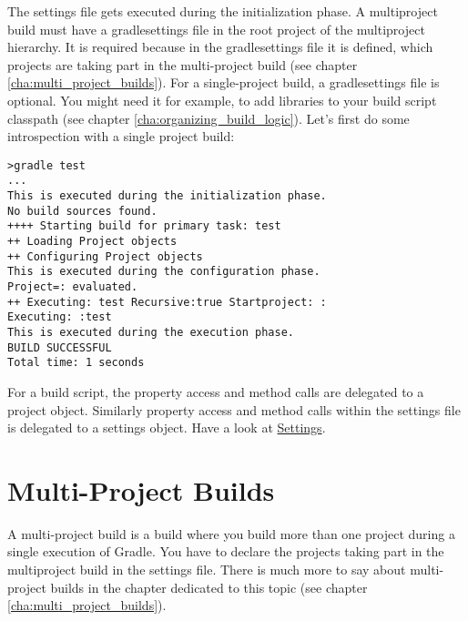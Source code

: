 The settings file gets executed during the initialization phase. A multiproject build must have a gradlesettings file in the root project of the multiproject hierarchy. It is required because in the gradlesettings file it is defined, which projects are taking part in the multi-project build (see chapter \ref{cha:multi_project_builds}). For a single-project build, a gradlesettings file is optional. You might need it for example, to add libraries to your build script classpath (see chapter \ref{cha:organizing_build_logic}). Let's first do some introspection with a single project build:
\begin{Verbatim}[frame=single,label=current dir: userguide/buildlifecycle,framesep=1mm,framerule=1mm]
>gradle test 
...
This is executed during the initialization phase. 
No build sources found. 
++++ Starting build for primary task: test 
++ Loading Project objects 
++ Configuring Project objects 
This is executed during the configuration phase. 
Project=: evaluated. 
++ Executing: test Recursive:true Startproject: : 
Executing: :test 
This is executed during the execution phase. 
BUILD SUCCESSFUL 
Total time: 1 seconds 
\end{Verbatim}
For a build script, the property access and method calls are delegated to a project object. Similarly property access and method calls within the settings file is delegated to a settings object. Have a look at \href{\API Settings.html}{\PKG Settings}.

\section{Multi-Project Builds} %
\label{sec:multi_project_builds}
A multi-project build is a build where you build more than one project during a single execution of Gradle. You have to declare the projects taking part in the multiproject build in the settings file. 
There is much more to say about multi-project builds in the chapter dedicated to this topic (see chapter \ref{cha:multi_project_builds}). 

